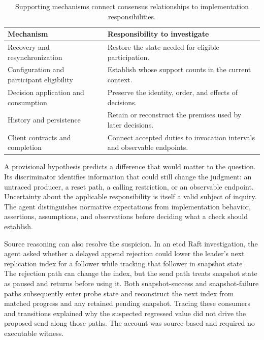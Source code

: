 \documentclass[10pt,twocolumn,letterpaper]{article}
\begin{document}
\begin{table}[t]
\caption{Supporting mechanisms connect consensus relationships to implementation responsibilities.}
\label{tab:mechanisms}
\small
\setlength{\tabcolsep}{4pt}
\begin{tabularx}{\columnwidth}{@{}>{\raggedright\arraybackslash}p{}>{\raggedright\arraybackslash}X@{}}
\toprule
Mechanism & Responsibility to investigate \\
\midrule
Recovery and resynchronization & Restore the state needed for eligible participation. \\
Configuration and participant eligibility & Establish whose support counts in the current context. \\
Decision application and consumption & Preserve the identity, order, and effects of decisions. \\
History and persistence & Retain or reconstruct the premises used by later decisions. \\
Client contracts and completion & Connect accepted duties to invocation intervals and observable endpoints. \\
\bottomrule
\end{tabularx}
\end{table}

A provisional hypothesis predicts a difference that would matter to the question. Its discriminator identifies information that could still change the judgment: an untraced producer, a reset path, a calling restriction, or an observable endpoint. Uncertainty about the applicable responsibility is itself a valid subject of inquiry. The agent distinguishes normative expectations from implementation behavior, assertions, assumptions, and observations before deciding what a check should establish.

Source reasoning can also resolve the suspicion. In an etcd Raft investigation, the agent asked whether a delayed append rejection could lower the leader's next replication index for a follower while tracking that follower in snapshot state~\cite{etcd-run}. The rejection path can change the index, but the send path treats snapshot state as paused and returns before using it. Both snapshot-success and snapshot-failure paths subsequently enter probe state and reconstruct the next index from matched progress and any retained pending snapshot. Tracing these consumers and transitions explained why the suspected regressed value did not drive the proposed send along those paths. The account was source-based and required no executable witness.
\end{document}
